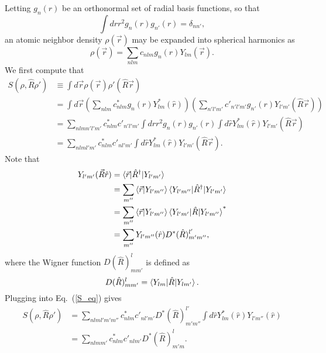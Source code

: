 \documentclass[%
preprint,
amsmath,amssymb,
aps,
]{revtex4-1}
\begin{document}
Letting $g_n(r)$ be an orthonormal set of radial basis functions, so that
\begin{equation}
\int dr r^2 g_n(r) g_{n'}(r) = \delta_{n n'},
\end{equation}
an atomic neighbor density $\rho(\vec{r})$ may be expanded into spherical harmonics as
\begin{equation}
\rho(\vec{r}) = \sum_{n l m} c_{n l m} g_n(r) Y_{l m} (\vec{r}).
\end{equation}
We first compute that
\begin{equation} \label{S_eq}
\begin{split}
   S(\rho, \hat{R} \rho') &\equiv \int d\vec{r} \rho(\vec{r}) \rho'(\hat{R} \vec{r}) \\
   &= \int d\vec{r} \left(\sum_{n l m} c_{n l m}^* g_n(r)Y_{l m}^*(\hat{r}) \right)\left(\sum_{n' l' m'} c'_{n' l' m'} g_{n'}(r)Y_{l' m'}(\hat{R} \vec{r}) \right) \\
   &= \sum_{n l m n' l' m'} c^*_{n l m} c'_{n' l' m'} \int dr r^2 g_n(r) g_{n'}(r) \int d\hat{r} Y^*_{l m}(\hat{r}) Y_{l' m'}(\hat{R} \vec{r}) \\
   &= \sum_{n l m l' m'} c^*_{n l m} c'_{n l' m'} \int d\hat{r} Y^*_{l m}(\hat{r}) Y_{l' m'} (\hat{R} \vec{r}).
\end{split}
\end{equation}
Note that
\begin{equation}
    \begin{split}
Y_{l' m'}(\vec{R} \hat{r}) &= \braket{\vec{r} | \hat{R}^\dagger | Y_{l' m'}} \\
&= \sum_{m''} \braket{\vec{r} | Y_{l' m''}} \braket{Y_{l' m''} | \hat{R}^\dagger | Y_{l' m'}} \\
&= \sum_{m''} \braket{\vec{r} | Y_{l' m''}} \braket{Y_{l' m'} | \hat{R} | Y_{l' m''}}^* \\
&= \sum_{m''} Y_{l' m''}(\hat{r}) D^*(\hat{R})_{m' m''}^{l'},
    \end{split}
\end{equation}
where the Wigner function $D(\hat{R})_{m m'}^{l}$ is defined as
\begin{equation}
D(\hat{R})_{m m'}^{l} = \braket{Y_{l m} | \hat{R} | Y_{l m'}}.
\end{equation}
Plugging into Eq.\ (\ref{S_eq}) gives
\begin{equation}
    \begin{split}
S(\rho, \hat{R} \rho') &= \sum_{n l m l' m' m''} c^*_{n l m} c'_{n l' m'} D^*(\hat{R})^{l'}_{m' m''} \int d\hat{r} Y^*_{l m }(\hat{r}) Y_{l' m''}(\hat{r}) \\
&= \sum_{n l m m'} c^*_{n l m} c'_{n l m'} D^*(\hat{R})^l_{m' m}.
    \end{split}
\end{equation}
\end{document}
